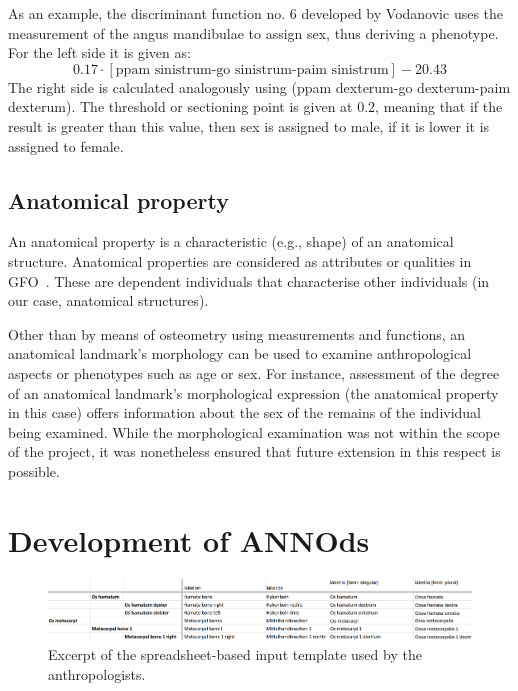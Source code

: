 \documentclass[sw]{iosart2x}
\begin{document}
As an example, the discriminant function no. 6 developed by Vodanovic uses the measurement of the angus mandibulae to assign sex, thus deriving a phenotype.
For the left side it is given as:
\[
0.17 \cdot [\text{ppam sinistrum-go sinistrum-paim sinistrum}] - 20.43
\]
The right side is calculated analogously using (ppam dexterum-go dexterum-paim dexterum).
The threshold or sectioning point is given at 0.2, meaning that if the result is greater than this value, then sex is assigned to male, if it is lower it is assigned to female.

\subsection{Anatomical property}
An anatomical property is a characteristic (e.g., shape) of an anatomical structure.
Anatomical properties are considered as attributes or qualities in GFO~\citep{gfoarchitecture}.
These are dependent individuals that characterise other individuals (in our case, anatomical structures).

Other than by means of osteometry using measurements and functions, an anatomical landmark's morphology can be used to examine anthropological aspects or phenotypes such as age or sex.
For instance, assessment of the degree of an anatomical landmark's morphological expression (the anatomical property in this case) offers information about the sex of the remains of the individual being examined.
While the morphological examination was not within the scope of the project, it was nonetheless ensured that future extension in this respect is possible.

\section{Development of ANNOds}\label{sec:domain}

\begin{figure}[h!t]
\includegraphics[width=\textwidth]{img/smog.png}
\caption{Excerpt of the spreadsheet-based input template used by the anthropologists.}\label{fig:smog}
\end{figure}
\end{document}
